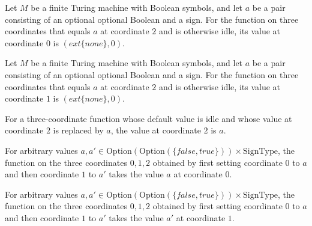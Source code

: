 \begin{theorem}
\label{Complexity.Meyer.one_2_0}
\leanok
{}
Let $M$ be a finite Turing machine with Boolean symbols, and let $a$ be a pair
consisting of an optional optional Boolean and a sign. For the function on three
coordinates that equals $a$ at coordinate $2$ and is otherwise idle, its value at
coordinate $0$ is $(	ext\{none\},0)$.
\end{theorem}

\begin{theorem}
\label{Complexity.Meyer.one_2_1}
\leanok
{}
Let $M$ be a finite Turing machine with Boolean symbols, and let $a$ be a pair
consisting of an optional optional Boolean and a sign. For the function on three
coordinates that equals $a$ at coordinate $2$ and is otherwise idle, its value at
coordinate $1$ is $(	ext\{none\},0)$.
\end{theorem}

\begin{theorem}
\label{Complexity.Meyer.one_2_2}
\leanok
{}
For a three-coordinate function whose default value is idle and whose value at
coordinate $2$ is replaced by $a$, the value at coordinate $2$ is $a$.
\end{theorem}

\begin{theorem}
\label{Complexity.Meyer.two_01_0}
\leanok
{}
For arbitrary values $a,a' \in \mathrm{Option}(\mathrm{Option}(\{false,true\}))\times \mathrm{SignType}$, the
function on the three coordinates $0,1,2$ obtained by first setting coordinate $0$ to
$a$ and then coordinate $1$ to $a'$ takes the value $a$ at coordinate $0$.
\end{theorem}

\begin{theorem}
\label{Complexity.Meyer.two_01_1}
\leanok
{}
For arbitrary values $a,a' \in \mathrm{Option}(\mathrm{Option}(\{false,true\}))\times \mathrm{SignType}$, the
function on the three coordinates $0,1,2$ obtained by first setting coordinate $0$ to
$a$ and then coordinate $1$ to $a'$ takes the value $a'$ at coordinate $1$.
\end{theorem}

